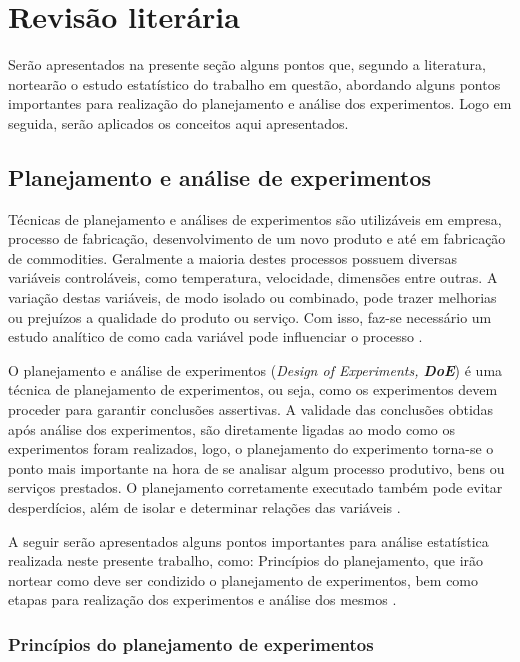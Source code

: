 \section{Revisão literária}

Serão apresentados na presente seção alguns pontos que, segundo a literatura, nortearão o estudo estatístico do trabalho em questão, abordando alguns pontos importantes para realização do planejamento e análise dos experimentos. Logo em seguida, serão aplicados os conceitos aqui apresentados.


\subsection{Planejamento e análise de experimentos}

Técnicas de planejamento e análises de experimentos são utilizáveis em empresa, processo de fabricação, desenvolvimento de um novo produto e até em fabricação de commodities. Geralmente a maioria destes processos possuem diversas variáveis controláveis, como temperatura, velocidade, dimensões entre outras. A variação destas variáveis, de modo isolado ou combinado, pode trazer melhorias ou prejuízos a qualidade do produto ou serviço. Com isso, faz-se necessário um estudo analítico de como cada variável pode influenciar o processo \cite{1}. 

O planejamento e análise de experimentos (\textit{Design of Experiments, \textbf{DoE}}) é uma técnica de planejamento de experimentos, ou seja, como os experimentos devem proceder para garantir conclusões assertivas. A validade das conclusões obtidas após análise dos experimentos, são diretamente ligadas ao modo como os experimentos foram realizados, logo, o planejamento do experimento torna-se o ponto mais importante na hora de se analisar algum processo produtivo, bens ou serviços prestados. O planejamento corretamente executado também pode evitar desperdícios, além de isolar e determinar relações das variáveis \cite{1}.

A seguir serão apresentados alguns pontos importantes para análise estatística realizada neste presente trabalho, como: Princípios do planejamento, que irão nortear como deve ser condizido o planejamento de experimentos, bem como etapas para realização dos experimentos e análise dos mesmos \cite{2}.


\subsubsection{Princípios do planejamento de experimentos}

